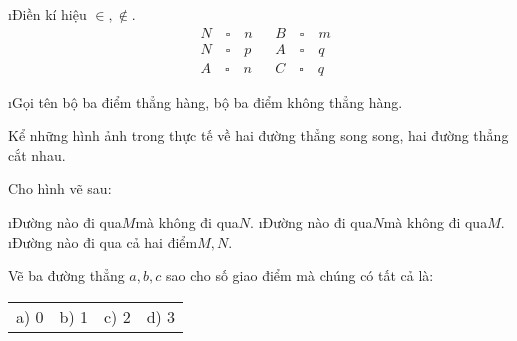 \begin{bt}
	\begin{enumerate}[a),leftmargin=*]
		\i Điền kí hiệu $\in ,\notin .$
		\begin{align*}
			&N \quad\square\quad n && B \quad\square\quad m\\
			&N \quad\square\quad p && A \quad\square\quad q\\
			&A \quad\square\quad n && C \quad\square\quad q
		\end{align*}
		\begin{center}
			\begin{tikzpicture}
				
			\end{tikzpicture}
		\end{center}
		\i Gọi tên bộ ba điểm thẳng hàng, bộ ba điểm không thẳng hàng.
	\end{enumerate}
	\begin{loigiaichuong}
		
	\end{loigiaichuong}
\end{bt}
\begin{bt}
	Kể những hình ảnh trong thực tế về hai đường thẳng song song, hai đường thẳng cắt nhau.
	\begin{loigiaichuong}
		
	\end{loigiaichuong}
\end{bt}
\begin{bt}
	Cho hình vẽ sau: 
	\begin{enumerate}[a),leftmargin=*]
		\i Đường nào đi qua$M$mà không đi qua$N$.
		\i Đường nào đi qua$N$mà không đi qua$M$.
		\i Đường nào đi qua cả hai điểm$M,N$.
	\end{enumerate}
	\begin{loigiaichuong}
		
	\end{loigiaichuong}
\end{bt}
\begin{bt}
	Vẽ ba đường thẳng $a,b,c$ sao cho số giao điểm mà chúng có tất cả là:
	
		\begin{tabular}{p{} p{} p{} p{}}
			a) 0 & b) 1 &c) 2& d) 3
		\end{tabular}
	\begin{loigiaichuong}
		
	\end{loigiaichuong}
\end{bt}
